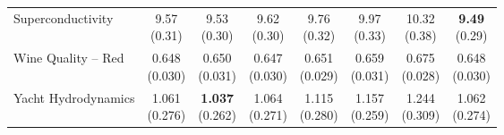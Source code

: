 {\begin{longtable}{lccccccc}
Superconductivity & \makecell{9.57\\{\tiny (0.31)}} & \makecell{9.53\\{\tiny (0.30)}} & \makecell{9.62\\{\tiny (0.30)}} & \makecell{9.76\\{\tiny (0.32)}} & \makecell{9.97\\{\tiny (0.33)}} & \makecell{10.32\\{\tiny (0.38)}} & \makecell{\textbf{9.49}\\{\tiny (0.29)}} \\
Wine Quality -- Red & \makecell{0.648\\{\tiny (0.030)}} & \makecell{0.650\\{\tiny (0.031)}} & \makecell{0.647\\{\tiny (0.030)}} & \makecell{0.651\\{\tiny (0.029)}} & \makecell{0.659\\{\tiny (0.031)}} & \makecell{0.675\\{\tiny (0.028)}} & \makecell{0.648\\{\tiny (0.030)}} \\
Yacht Hydrodynamics & \makecell{1.061\\{\tiny (0.276)}} & \makecell{\textbf{1.037}\\{\tiny (0.262)}} & \makecell{1.064\\{\tiny (0.271)}} & \makecell{1.115\\{\tiny (0.280)}} & \makecell{1.157\\{\tiny (0.259)}} & \makecell{1.244\\{\tiny (0.309)}} & \makecell{1.062\\{\tiny (0.274)}} \\
\bottomrule
\end{longtable}}
